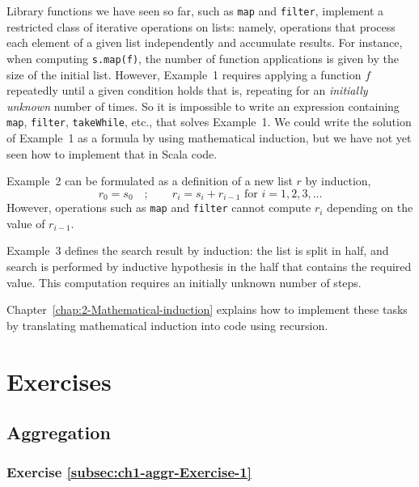 Library functions we have seen so far, such as \texttt{}\lstinline!map!
and \lstinline!filter!, implement a restricted class of iterative
operations on lists: namely, operations that process each element
of a given list independently and accumulate results. For instance,
when computing \lstinline!s.map(f)!, the number of function applications
is given by the size of the initial list. However, Example\ 1 requires
applying a function $f$ repeatedly until a given condition holds
\textemdash{} that is, repeating for an \emph{initially unknown} number
of times. So it is impossible to write an expression containing \lstinline!map!,
\lstinline!filter!, \lstinline!takeWhile!, etc., that solves Example\ 1.
We could write the solution of Example\ 1 as a formula by using mathematical
induction, but we have not yet seen how to implement that in Scala
code. 

Example\ 2 can be formulated as a definition of a new list $r$ by
induction, 
\[
r_{0}=s_{0}\quad;\quad\quad r_{i}=s_{i}+r_{i-1}\text{ for }i=1,2,3,...
\]
However, operations such as \texttt{}\lstinline!map! and \texttt{}\lstinline!filter!
cannot compute $r_{i}$ depending on the value of $r_{i-1}$.

Example\ 3 defines the search result by induction: the list is split
in half, and search is performed by inductive hypothesis in the half
that contains the required value. This computation requires an initially
unknown number of steps.

Chapter\ \ref{chap:2-Mathematical-induction} explains how to implement
these tasks by translating mathematical induction into code using
recursion.

\section{Exercises\label{sec:beginner-Exercises}}

\subsection{Aggregation}

\subsubsection{Exercise \label{subsec:ch1-aggr-Exercise-1}\ref{subsec:ch1-aggr-Exercise-1}}

